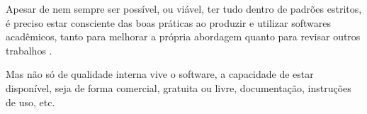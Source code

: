 Apesar de nem sempre ser possível, ou viável, ter tudo dentro de padrões
estritos, é preciso estar consciente das boas práticas ao produzir e utilizar
softwares acadêmicos, tanto para melhorar a própria abordagem quanto para
revisar outros trabalhos \cite{wilson2014best}.

Mas não só de qualidade interna vive o software, a capacidade de estar disponível, seja
de forma comercial, gratuita ou livre, documentação, instruções de uso, etc.




%
%
%
%
%
%
% 
% 
% 
% 


